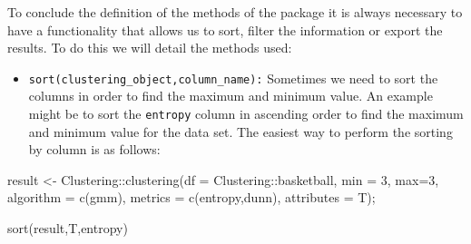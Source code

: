 \documentclass[
]{article}
\newenvironment{Shaded}{\begin{snugshade}}{\end{snugshade}}
\newcommand{\AttributeTok}[1]{\textcolor[rgb]{0.77,0.63,0.00}{#1}}
\newcommand{\DecValTok}[1]{\textcolor[rgb]{0.00,0.00,0.81}{#1}}
\newcommand{\FunctionTok}[1]{\textcolor[rgb]{0.00,0.00,0.00}{#1}}
\newcommand{\NormalTok}[1]{#1}
\newcommand{\OtherTok}[1]{\textcolor[rgb]{0.56,0.35,0.01}{#1}}
\newcommand{\SpecialCharTok}[1]{\textcolor[rgb]{0.00,0.00,0.00}{#1}}
\newcommand{\StringTok}[1]{\textcolor[rgb]{0.31,0.60,0.02}{#1}}
\providecommand{\tightlist}{%
  \setlength{\itemsep}{0pt}\setlength{\parskip}{0pt}}
\begin{document}
To conclude the definition of the methods of the package it is always
necessary to have a functionality that allows us to sort, filter the
information or export the results. To do this we will detail the methods
used:

\begin{itemize}
\tightlist
\item
  \texttt{sort(clustering\_object,column\_name):} Sometimes we need to
  sort the columns in order to find the maximum and minimum value. An
  example might be to sort the \texttt{entropy} column in ascending
  order to find the maximum and minimum value for the data set. The
  easiest way to perform the sorting by column is as follows:
\end{itemize}

\begin{Shaded}
\begin{Highlighting}[]
\NormalTok{result }\OtherTok{\textless{}{-}}\NormalTok{ Clustering}\SpecialCharTok{::}\FunctionTok{clustering}\NormalTok{(}\AttributeTok{df =}\NormalTok{ Clustering}\SpecialCharTok{::}\NormalTok{basketball, }\AttributeTok{min =} \DecValTok{3}\NormalTok{, }\AttributeTok{max=}\DecValTok{3}\NormalTok{, }
          \AttributeTok{algorithm =} \FunctionTok{c}\NormalTok{(}\StringTok{\textquotesingle{}gmm\textquotesingle{}}\NormalTok{), }\AttributeTok{metrics =} \FunctionTok{c}\NormalTok{(}\StringTok{\textquotesingle{}entropy\textquotesingle{}}\NormalTok{,}\StringTok{\textquotesingle{}dunn\textquotesingle{}}\NormalTok{), }\AttributeTok{attributes =}\NormalTok{ T);}

\FunctionTok{sort}\NormalTok{(result,T,}\StringTok{\textquotesingle{}entropy\textquotesingle{}}\NormalTok{)}
\end{Highlighting}
\end{Shaded}
\end{document}

